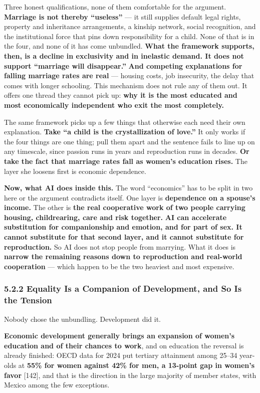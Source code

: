 \documentclass[11pt,a4paper]{article}
\begin{document}
Three honest qualifications, none of them comfortable for the argument. \textbf{Marriage is not thereby ``useless''} --- it still supplies default legal rights, property and inheritance arrangements, a kinship network, social recognition, and the institutional force that pins down responsibility for a child. None of that is in the four, and none of it has come unbundled. \textbf{What the framework supports, then, is a decline in exclusivity and in inelastic demand. It does not support ``marriage will disappear.''} \textbf{And competing explanations for falling marriage rates are real} --- housing costs, job insecurity, the delay that comes with longer schooling. This mechanism does not rule any of them out. It offers one thread they cannot pick up: \textbf{why it is the most educated and most economically independent who exit the most completely.}

The same framework picks up a few things that otherwise each need their own explanation. \textbf{Take ``a child is the crystallization of love.''} It only works if the four things are one thing; pull them apart and the sentence fails to line up on any timescale, since passion runs in years and reproduction runs in decades. \textbf{Or take the fact that marriage rates fall as women's education rises.} The layer she loosens first is economic dependence.

\textbf{Now, what AI does inside this.} The word ``economics'' has to be split in two here or the argument contradicts itself. One layer is \textbf{dependence on a spouse's income.} The other is \textbf{the real cooperative work of two people carrying housing, childrearing, care and risk together.} \textbf{AI can accelerate substitution for companionship and emotion, and for part of sex. It cannot substitute for that second layer, and it cannot substitute for reproduction.} So AI does not stop people from marrying. What it does is \textbf{narrow the remaining reasons down to reproduction and real-world cooperation} --- which happen to be the two heaviest and most expensive.

\subsubsection{5.2.2 Equality Is a Companion of Development, and So Is the Tension}

Nobody chose the unbundling. Development did it.

\textbf{Economic development generally brings an expansion of women's education and of their chances to work}, and on education the reversal is already finished: OECD data for 2024 put tertiary attainment among 25--34 year-olds at \textbf{55\% for women against 42\% for men, a 13-point gap in women's favor}{} [142], and that is the direction in the large majority of member states, with Mexico among the few exceptions.
\end{document}
